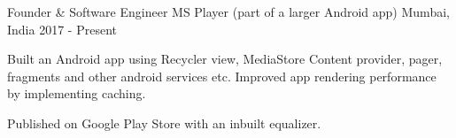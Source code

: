 \begin{cventries}

  \cventry
    {Founder \& Software Engineer} %
    {MS Player (part of a larger Android app)} %
    {Mumbai, India} %
    {2017 - Present} %
    {
      \begin{cvitems} %
        \item {Built an Android app using Recycler view, MediaStore Content provider, pager, fragments and other android services etc. Improved app rendering performance by implementing caching. }
        \item {Published on Google Play Store with an inbuilt equalizer. }
      \end{cvitems}
    }


\end{cventries}